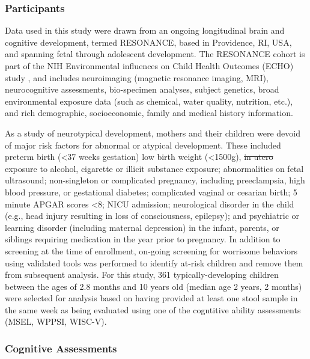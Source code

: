 \documentclass{article}
\providecommand{\DIFadd}[1]{{\protect\color{blue}\uwave{#1}}} %
\providecommand{\DIFdel}[1]{{\protect\color{red}\sout{#1}}}                      %
\providecommand{\DIFaddbegin}{} %
\providecommand{\DIFaddend}{} %
\providecommand{\DIFdelbegin}{} %
\providecommand{\DIFdelend}{} %
\newcommand{\DIFscaledelfig}{0.5}
\newlength{\DIFdelgraphicswidth} %
\newlength{\DIFdelgraphicsheight} %
\newcommand{\DIFaddincludegraphics}[2][]{{\color{blue}\fbox{\DIFOincludegraphics[#1]{#2}}}} %
\newcommand{\DIFdelincludegraphics}[2][]{%
\sbox{\DIFdelgraphicsbox}{\DIFOincludegraphics[#1]{#2}}%
\settoboxwidth{\DIFdelgraphicswidth}{\DIFdelgraphicsbox} %
\settoboxtotalheight{\DIFdelgraphicsheight}{\DIFdelgraphicsbox} %
\scalebox{\DIFscaledelfig}{%
\parbox[b]{\DIFdelgraphicswidth}{\usebox{\DIFdelgraphicsbox}\\[-\baselineskip] \rule{\DIFdelgraphicswidth}{0em}}\llap{\resizebox{\DIFdelgraphicswidth}{\DIFdelgraphicsheight}{%
\setlength{\unitlength}{\DIFdelgraphicswidth}%
\begin{picture}(1,1)%
\thicklines\linethickness{2pt} %
{\color[rgb]{1,0,0}\put(0,0){\framebox(1,1){}}}%
{\color[rgb]{1,0,0}\put(0,0){\line( 1,1){1}}}%
{\color[rgb]{1,0,0}\put(0,1){\line(1,-1){1}}}%
\end{picture}%
}\hspace*{3pt}}} %
} %
\DeclareRobustCommand{\DIFaddbegin}{\DIFOaddbegin \let\includegraphics\DIFaddincludegraphics} %
\DeclareRobustCommand{\DIFaddend}{\DIFOaddend \let\includegraphics\DIFOincludegraphics} %
\DeclareRobustCommand{\DIFdelbegin}{\DIFOdelbegin \let\includegraphics\DIFdelincludegraphics} %
\DeclareRobustCommand{\DIFdelend}{\DIFOaddend \let\includegraphics\DIFOincludegraphics} %
\begin{document}
\subsubsection*{Participants}

Data used in this study were drawn from an ongoing longitudinal
brain and cognitive development, termed RESONANCE, based in Providence, RI, USA,
and spanning fetal through adolescent development. The
RESONANCE cohort is part of the NIH Environmental influences
on Child Health Outcomes (ECHO) study
\cite{forrestAdvancingScienceChildren2018,gillmanEnvironmentalInfluencesChild2018},
and includes neuroimaging (magnetic
resonance imaging, MRI), neurocognitive assessments, bio-specimen
analyses, subject genetics, broad environmental exposure data
(such as chemical, water quality, nutrition, etc.), and
rich demographic, socioeconomic, family and medical history information.

As a study of neurotypical development, mothers and their children
were devoid of major risk factors for abnormal or atypical development.
These included preterm birth (\textless 37 weeks gestation) low birth weight (\textless 1500g),
\DIFdelbegin \DIFdel{in utero }\DIFdelend \DIFaddbegin \textit{\DIFadd{in utero}} \DIFaddend exposure to alcohol, cigarette or illicit substance exposure;
abnormalities on fetal ultrasound; non-singleton or complicated pregnancy,
including preeclampsia, high blood pressure, or gestational diabetes;
complicated vaginal or cesarian birth; 5 minute APGAR scores \textless 8;
NICU admission; neurological disorder in the child
(e.g., head injury resulting in loss of consciousness, epilepsy);
and psychiatric or learning disorder (including maternal depression)
in the infant, parents, or siblings requiring medication in the year prior to pregnancy.
In addition to screening at
the time of enrollment, on-going screening for worrisome behaviors using
validated tools was performed to identify at-risk children and remove
them from subsequent analysis.
For this study, 361 typically-developing children between the
ages of 2.8 months and 10 years old (median age 2 years, 2 months) were
selected for analysis based on having provided at least one stool sample
in the same week as being evaluated using one of the cogntitive ability
assessments (MSEL, WPPSI, WISC-V).

\subsubsection*{Cognitive Assessments}
\end{document}
